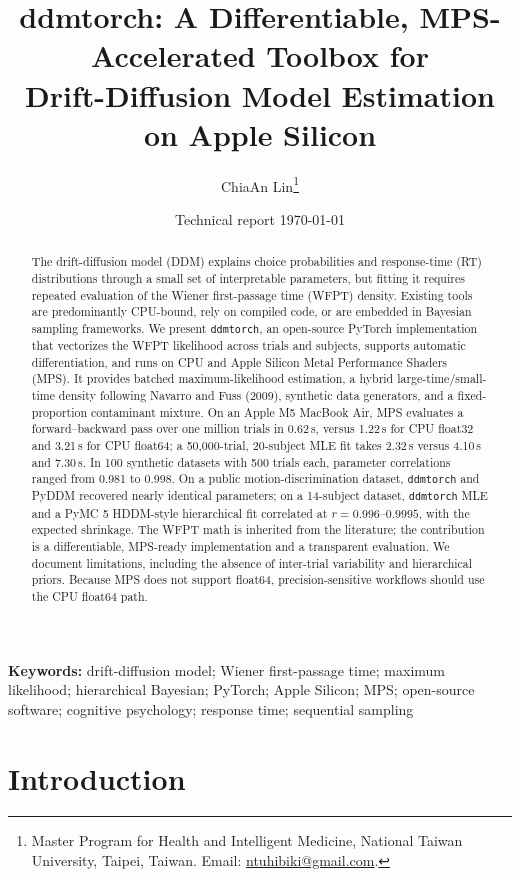 \documentclass[11pt]{article}
\title{\textbf{ddmtorch: A Differentiable, MPS-Accelerated Toolbox for\\Drift-Diffusion Model Estimation on Apple Silicon}}
\author{ChiaAn Lin\thanks{Master Program for Health and Intelligent Medicine, National Taiwan University, Taipei, Taiwan. Email: \href{mailto:ntuhibiki@gmail.com}{ntuhibiki@gmail.com}.}}
\date{Technical report \textperiodcentered{} \today}
\begin{document}
\maketitle

\begin{abstract}
The drift-diffusion model (DDM) explains choice probabilities and response-time (RT) distributions through a small set of interpretable parameters, but fitting it requires repeated evaluation of the Wiener first-passage time (WFPT) density. Existing tools are predominantly CPU-bound, rely on compiled code, or are embedded in Bayesian sampling frameworks. We present \texttt{ddmtorch}, an open-source PyTorch \citep{Paszke2019} implementation that vectorizes the WFPT likelihood across trials and subjects, supports automatic differentiation, and runs on CPU and Apple Silicon Metal Performance Shaders (MPS). It provides batched maximum-likelihood estimation, a hybrid large-time/small-time density following Navarro and Fuss (2009), synthetic data generators, and a fixed-proportion contaminant mixture. On an Apple M5 MacBook Air, MPS evaluates a forward--backward pass over one million trials in 0.62\,s, versus 1.22\,s for CPU float32 and 3.21\,s for CPU float64; a 50,000-trial, 20-subject MLE fit takes 2.32\,s versus 4.10\,s and 7.30\,s. In 100 synthetic datasets with 500 trials each, parameter correlations ranged from 0.981 to 0.998. On a public motion-discrimination dataset, \texttt{ddmtorch} and PyDDM recovered nearly identical parameters; on a 14-subject dataset, \texttt{ddmtorch} MLE and a PyMC 5 HDDM-style hierarchical fit correlated at $r=0.996$--$0.9995$, with the expected shrinkage. The WFPT math is inherited from the literature; the contribution is a differentiable, MPS-ready implementation and a transparent evaluation. We document limitations, including the absence of inter-trial variability and hierarchical priors. Because MPS does not support float64, precision-sensitive workflows should use the CPU float64 path.
\end{abstract}

\noindent\textbf{Keywords:} drift-diffusion model; Wiener first-passage time; maximum likelihood; hierarchical Bayesian; PyTorch; Apple Silicon; MPS; open-source software; cognitive psychology; response time; sequential sampling

\section{Introduction}
\end{document}
